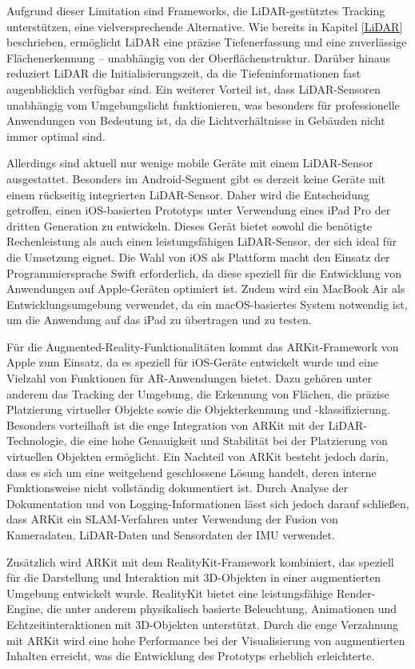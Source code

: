 Aufgrund dieser Limitation sind Frameworks, die LiDAR-gestütztes Tracking unterstützen, eine vielversprechende Alternative. Wie bereits in Kapitel \ref{LiDAR} beschrieben, ermöglicht LiDAR eine präzise Tiefenerfassung und eine zuverlässige Flächenerkennung – unabhängig von der Oberflächenstruktur. Darüber hinaus reduziert LiDAR die Initialisierungszeit, da die Tiefeninformationen fast augenblicklich verfügbar sind. Ein weiterer Vorteil ist, dass LiDAR-Sensoren unabhängig vom Umgebungslicht funktionieren, was besonders für professionelle Anwendungen von Bedeutung ist, da die Lichtverhältnisse in Gebäuden nicht immer optimal sind. \cite{appledevdoc}

Allerdings sind aktuell nur wenige mobile Geräte mit einem LiDAR-Sensor ausgestattet. Besonders im Android-Segment gibt es derzeit keine Geräte mit einem rückseitig integrierten LiDAR-Sensor. Daher wird die Entscheidung getroffen, einen iOS-basierten Prototyps unter Verwendung eines iPad Pro der dritten Generation zu entwickeln. Dieses Gerät bietet sowohl die benötigte Rechenleistung als auch einen leistungsfähigen LiDAR-Sensor, der sich ideal für die Umsetzung eignet. Die Wahl von iOS als Plattform macht den Einsatz der Programmiersprache Swift erforderlich, da diese speziell für die Entwicklung von Anwendungen auf Apple-Geräten optimiert ist. Zudem wird ein MacBook Air als Entwicklungsumgebung verwendet, da ein macOS-basiertes System notwendig ist, um die Anwendung auf das iPad zu übertragen und zu testen. \cite{appledevdoc}

Für die Augmented-Reality-Funktionalitäten kommt das ARKit-Framework von Apple zum Einsatz, da es speziell für iOS-Geräte entwickelt wurde und eine Vielzahl von Funktionen für AR-Anwendungen bietet. Dazu gehören unter anderem das Tracking der Umgebung, die Erkennung von Flächen, die präzise Platzierung virtueller Objekte sowie die Objekterkennung und -klassifizierung. Besonders vorteilhaft ist die enge Integration von ARKit mit der LiDAR-Technologie, die eine hohe Genauigkeit und Stabilität bei der Platzierung von virtuellen Objekten ermöglicht. Ein Nachteil von ARKit besteht jedoch darin, dass es sich um eine weitgehend geschlossene Lösung handelt, deren interne Funktionsweise nicht vollständig dokumentiert ist. Durch Analyse der Dokumentation und von Logging-Informationen lässt sich jedoch darauf schließen, dass ARKit ein SLAM-Verfahren unter Verwendung der Fusion von Kameradaten, LiDAR-Daten und Sensordaten der IMU verwendet. \cite{appledevdoc}

Zusätzlich wird ARKit mit dem RealityKit-Framework kombiniert, das speziell für die Darstellung und Interaktion mit 3D-Objekten in einer augmentierten Umgebung entwickelt wurde. RealityKit bietet eine leistungsfähige Render-Engine, die unter anderem physikalisch basierte Beleuchtung, Animationen und Echtzeitinteraktionen mit 3D-Objekten unterstützt. Durch die enge Verzahnung mit ARKit wird eine hohe Performance bei der Visualisierung von augmentierten Inhalten erreicht, was die Entwicklung des Prototyps erheblich erleichterte. \cite{appledevdoc}


